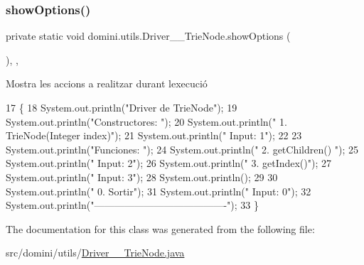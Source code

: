 \mbox{\label{classdomini_1_1utils_1_1Driver____TrieNode_ab9e971ebb4f8e219efaab32c6654243a}} 
\subsubsection{\texorpdfstring{show\+Options()}{showOptions()}}
{\footnotesize\ttfamily private static void domini.\+utils.\+Driver\+\_\+\+\_\+\+Trie\+Node.\+show\+Options (\begin{DoxyParamCaption}{ }\end{DoxyParamCaption})\hspace{0.3cm}{\ttfamily [inline]}, {\ttfamily [static]}, {\ttfamily [private]}}



Mostra les accions a realitzar durant l\textquotesingle{}execució 


\begin{DoxyCode}
17                                      \{
18         System.out.println(\textcolor{stringliteral}{"Driver de TrieNode"});
19         System.out.println(\textcolor{stringliteral}{"Constructores: "});
20         System.out.println(\textcolor{stringliteral}{"     1. TrieNode(Integer index)"});
21         System.out.println(\textcolor{stringliteral}{"     Input: 1"});
22 
23         System.out.println(\textcolor{stringliteral}{"Funciones: "});
24         System.out.println(\textcolor{stringliteral}{"     2. getChildren() "});
25         System.out.println(\textcolor{stringliteral}{"     Input: 2"});
26         System.out.println(\textcolor{stringliteral}{"     3. getIndex()"});
27         System.out.println(\textcolor{stringliteral}{"     Input: 3"});
28         System.out.println();
29 
30         System.out.println(\textcolor{stringliteral}{"     0. Sortir"});
31         System.out.println(\textcolor{stringliteral}{"     Input: 0"});
32         System.out.println(\textcolor{stringliteral}{"----------------------------------------"});
33     \}
\end{DoxyCode}


The documentation for this class was generated from the following file\+:\begin{DoxyCompactItemize}
\item 
src/domini/utils/\hyperlink{Driver____TrieNode_8java}{Driver\+\_\+\+\_\+\+Trie\+Node.\+java}\end{DoxyCompactItemize}
